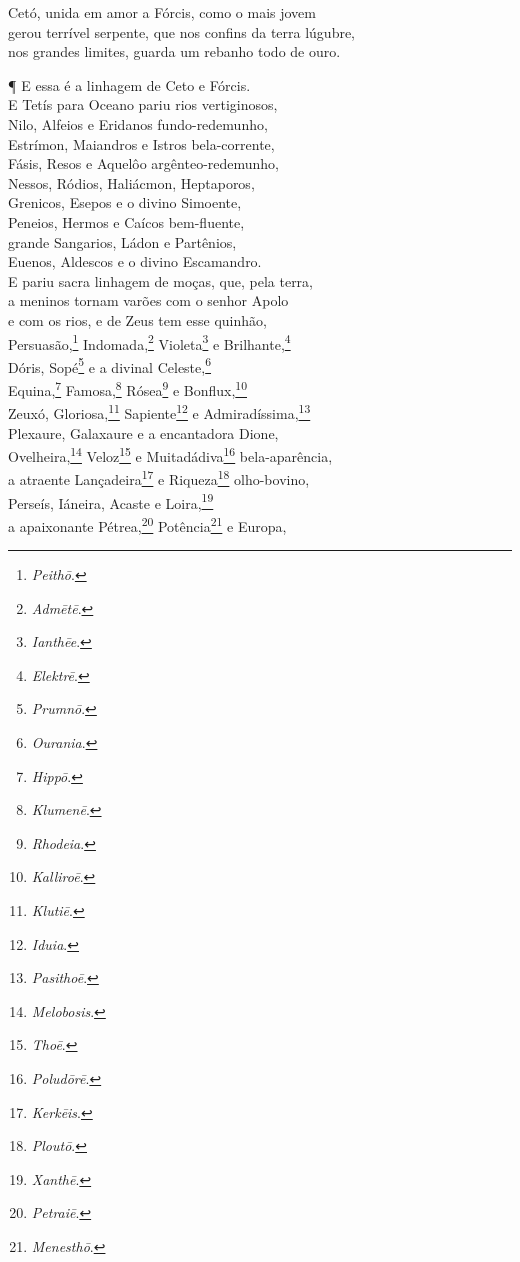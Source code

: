 \quad{}Cetó, unida em amor a Fórcis, como o mais jovem\\
gerou terrível serpente, que nos confins da terra lúgubre,\\
nos grandes limites, guarda um rebanho todo de ouro.

¶ E essa é a linhagem de Ceto e Fórcis.\\
E Tetís para Oceano pariu rios vertiginosos,\\
Nilo, Alfeios e Eridanos fundo-redemunho,\\
Estrímon, Maiandros e Istros bela-corrente,\\
Fásis, Resos e Aquelôo argênteo-redemunho, \\
Nessos, Ródios, Haliácmon, Heptaporos,\\
Grenicos, Esepos e o divino Simoente,\\
Peneios, Hermos e Caícos bem-fluente,\\
grande Sangarios, Ládon e Partênios,\\
Euenos, Aldescos e o divino Escamandro. \\
E pariu sacra linhagem de moças, que, pela terra,\\
a meninos tornam varões com o senhor Apolo\\
e com os rios, e de Zeus tem esse quinhão,\\
Persuasão,\footnote{\emph{Peithō}.} Indomada,\footnote{\emph{Admētē}.} Violeta\footnote{\emph{Ianthēe}.} e Brilhante,\footnote{\emph{Elektrē}.}\\
Dóris, Sopé\footnote{\emph{Prumnō}.} e a divinal Celeste,\footnote{\emph{Ourania}.} \\
Equina,\footnote{\emph{Hippō}.} Famosa,\footnote{\emph{Klumenē}.} Rósea\footnote{\emph{Rhodeia}.} e Bonflux,\footnote{\emph{Kalliroē}.}\\
Zeuxó, Gloriosa,\footnote{\emph{Klutiē}.} Sapiente\footnote{\emph{Iduia}.} e Admiradíssima,\footnote{\emph{Pasithoē}.}\\
Plexaure, Galaxaure e a encantadora Dione,\\
Ovelheira,\footnote{\emph{Melobosis}.} Veloz\footnote{\emph{Thoē}.} e Muitadádiva\footnote{\emph{Poludōrē}.} bela-aparência,\\
a atraente Lançadeira\footnote{\emph{Kerkēis}.} e Riqueza\footnote{\emph{Ploutō}.} olho-bovino,\\ 
Perseís, Iáneira, Acaste e Loira,\footnote{\emph{Xanthē}.}\\
a apaixonante Pétrea,\footnote{\emph{Petraiē}.} Potência\footnote{\emph{Menesthō}.} e Europa,\\
